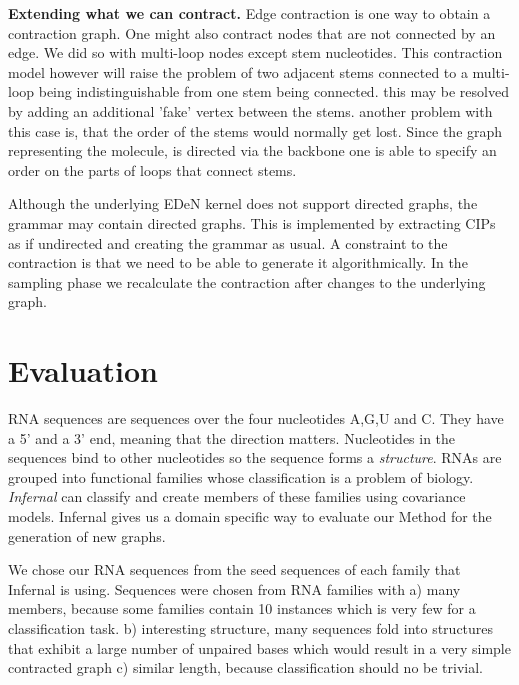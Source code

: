 \documentclass{article}
\begin{document}
\textbf{Extending what we can contract.}
Edge contraction is one way to obtain a contraction graph. 
One might also contract nodes that are not connected by an edge.
We did so with multi-loop nodes except stem nucleotides.
This contraction model however will raise the problem 
of two adjacent stems connected to a multi-loop being
indistinguishable from one stem being connected.
this may be resolved by adding an additional 'fake' vertex 
between the stems. another problem with 
this case is, that the order of the stems would normally get lost.
Since the graph representing the molecule, is directed via 
the backbone one is able to specify an order on the
parts of loops that connect stems.

Although the underlying EDeN kernel does not support directed graphs,
the grammar may contain directed graphs. This is implemented by extracting
CIPs as if undirected and creating the grammar as usual.
A constraint to the contraction is that we need to be able to 
generate it algorithmically. In the sampling phase we recalculate 
the contraction after changes to the underlying graph.


\section{Evaluation}
RNA sequences are sequences over the four nucleotides A,G,U and C.
They have a 5' and a 3' end, meaning that the direction matters.
Nucleotides in the sequences bind to other nucleotides so
the sequence forms a \emph{structure}.
RNAs are grouped into functional families whose classification
is a problem of biology. \emph{Infernal}\cite{infernal} can classify and 
create members of these families using covariance models.
Infernal gives us a domain specific way to evaluate
our Method for the generation of new graphs. 

We chose our RNA sequences from the seed sequences of each family
that Infernal is using\cite{rfam}. Sequences were chosen from RNA families with
a) many members, because some families contain 10
instances which is very few for a classification task. b) interesting 
structure, many sequences fold into structures that exhibit a large number of 
unpaired bases which would result in a very simple contracted graph
c) similar length, because classification should no be trivial.
\end{document}
